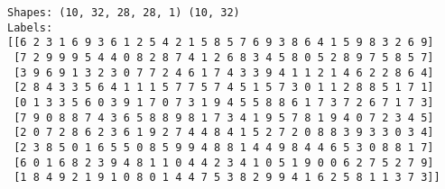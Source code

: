 \documentclass[11pt]{article}
\begin{document}
    \begin{Verbatim}[commandchars=\\\{\}]
Shapes: (10, 32, 28, 28, 1) (10, 32)
Labels:
[[6 2 3 1 6 9 3 6 1 2 5 4 2 1 5 8 5 7 6 9 3 8 6 4 1 5 9 8 3 2 6 9]
 [7 2 9 9 9 5 4 4 0 8 2 8 7 4 1 2 6 8 3 4 5 8 0 5 2 8 9 7 5 8 5 7]
 [3 9 6 9 1 3 2 3 0 7 7 2 4 6 1 7 4 3 3 9 4 1 1 2 1 4 6 2 2 8 6 4]
 [2 8 4 3 3 5 6 4 1 1 1 5 7 7 5 7 4 5 1 5 7 3 0 1 1 2 8 8 5 1 7 1]
 [0 1 3 3 5 6 0 3 9 1 7 0 7 3 1 9 4 5 5 8 8 6 1 7 3 7 2 6 7 1 7 3]
 [7 9 0 8 8 7 4 3 6 5 8 8 9 8 1 7 3 4 1 9 5 7 8 1 9 4 0 7 2 3 4 5]
 [2 0 7 2 8 6 2 3 6 1 9 2 7 4 4 8 4 1 5 2 7 2 0 8 8 3 9 3 3 0 3 4]
 [2 3 8 5 0 1 6 5 5 0 8 5 9 9 4 8 8 1 4 4 9 8 4 4 6 5 3 0 8 8 1 7]
 [6 0 1 6 8 2 3 9 4 8 1 1 0 4 4 2 3 4 1 0 5 1 9 0 0 6 2 7 5 2 7 9]
 [1 8 4 9 2 1 9 1 0 8 0 1 4 4 7 5 3 8 2 9 9 4 1 6 2 5 8 1 1 3 7 3]]
    \end{Verbatim}
\end{document}

